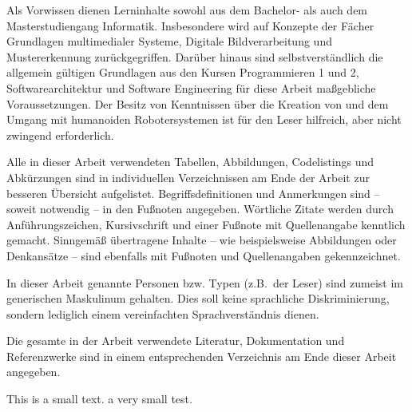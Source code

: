 \documentclass[fontsize=11pt,paper=a4,twoside,openright]{scrreprt}
\begin{document}

Als Vorwissen dienen Lerninhalte sowohl aus dem Bachelor- als auch dem Masterstudiengang Informatik.
Insbesondere wird auf Konzepte der Fächer Grundlagen multimedialer Systeme, Digitale Bildverarbeitung und Mustererkennung zurückgegriffen.
Darüber hinaus sind selbstverständlich die allgemein gültigen Grundlagen aus den Kursen Programmieren 1 und 2, Softwarearchitektur und Software Engineering für diese Arbeit maßgebliche Voraussetzungen.
Der Besitz von Kenntnissen über die Kreation von und dem Umgang mit humanoiden Robotersystemen ist für den Leser hilfreich, aber nicht zwingend erforderlich.


Alle in dieser Arbeit verwendeten Tabellen, Abbildungen, Codelistings und Abkürzungen sind in individuellen Verzeichnissen am Ende der Arbeit zur besseren Übersicht aufgelistet.
Begriffsdefinitionen und Anmerkungen sind -- soweit notwendig -- in den Fußnoten angegeben.
Wörtliche Zitate werden durch Anführungszeichen, Kursivschrift und einer Fußnote mit Quellenangabe kenntlich gemacht.
Sinngemäß übertragene Inhalte -- wie beispielsweise Abbildungen oder Denkansätze -- sind ebenfalls mit Fußnoten und Quellenangaben gekennzeichnet.

In dieser Arbeit genannte Personen bzw. Typen (z.B.\ der Leser) sind zumeist im generischen Maskulinum gehalten.
Dies soll keine sprachliche Diskriminierung, sondern lediglich einem vereinfachten Sprachverständnis dienen.

Die gesamte in der Arbeit verwendete Literatur, Dokumentation und Referenzwerke sind in einem entsprechenden Verzeichnis am Ende dieser Arbeit angegeben.

This is a small text. a very small test.

\clearpage

\newpage
\section*{}
\end{document}
